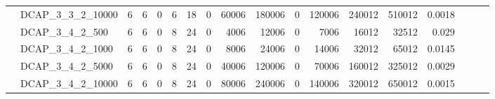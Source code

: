 \begin{landscape}
\begin{longtable}[c]{llrrrrrrrrrrrrrlll}
		& DCAP\_3\_3\_2\_10000         & 6                           & 6                          & 0                          & 6                           & 18                         & 0                          & 60006                      & 180006                    & 0                         & 120006                     & 240012                     & 510012                         & 0.0018                        &                          &                          &                          \\
		& DCAP\_3\_4\_2\_500           & 6                           & 6                          & 0                          & 8                           & 24                         & 0                          & 4006                       & 12006                     & 0                         & 7006                       & 16012                      & 32512                          & 0.029                         &                          &                          &                          \\
		& DCAP\_3\_4\_2\_1000          & 6                           & 6                          & 0                          & 8                           & 24                         & 0                          & 8006                       & 24006                     & 0                         & 14006                      & 32012                      & 65012                          & 0.0145                        &                          &                          &                          \\
		& DCAP\_3\_4\_2\_5000          & 6                           & 6                          & 0                          & 8                           & 24                         & 0                          & 40006                      & 120006                    & 0                         & 70006                      & 160012                     & 325012                         & 0.0029                        &                          &                          &                          \\
		& DCAP\_3\_4\_2\_10000         & 6                           & 6                          & 0                          & 8                           & 24                         & 0                          & 80006                      & 240006                    & 0                         & 140006                     & 320012                     & 650012                         & 0.0015                        &                          &                          &                          \\ \hline

\end{longtable}
\end{landscape}
